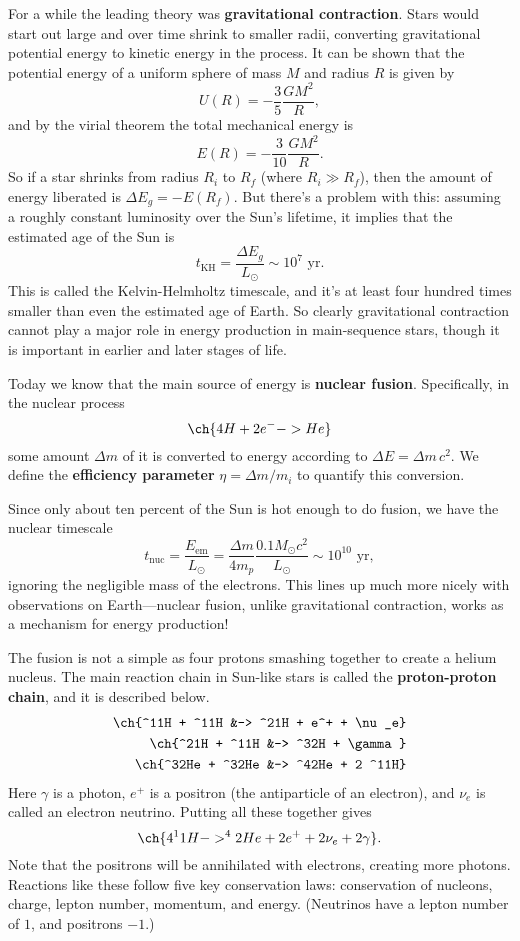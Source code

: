 \documentclass[../a062main.tex]{subfiles}
\begin{document}
For a while the leading theory was \textbf{gravitational contraction}.
Stars would start out large and over time shrink to smaller radii, converting gravitational potential energy to kinetic energy in the process.
It can be shown that the potential energy of a uniform sphere of mass $M$ and radius $R$ is given by
\[ U(R) = -\frac{3}{5} \frac{GM^2}{R}, \]
and by the virial theorem the total mechanical energy is
\[ E(R) = -\frac{3}{10} \frac{GM^2}{R}. \]
So if a star shrinks from radius $R_i$ to $R_f$ (where $R_i \gg R_f$), then the amount of energy liberated is $\Delta E_g = -E(R_f)$.
But there's a problem with this: assuming a roughly constant luminosity over the Sun's lifetime, it implies that the estimated age of the Sun is
\[ t_\textrm{KH} = \frac{\Delta E_g}{L_\odot} \sim 10^{7} \text{ yr}. \]
This is called the Kelvin-Helmholtz timescale, and it's at least four hundred times smaller than even the estimated age of Earth.
So clearly gravitational contraction cannot play a major role in energy production in main-sequence stars, though it is important in earlier and later stages of life.

Today we know that the main source of energy is \textbf{nuclear fusion}.
Specifically, in the nuclear process
\[ \ch{4 H + 2 e^- -> He} \]
some amount $\Delta m$ of it is converted to energy according to $\Delta E = \Delta m \,c^2$.
We define the \textbf{efficiency parameter} $\eta = \Delta m / m_i$ to quantify this conversion.

Since only about ten percent of the Sun is hot enough to do fusion, we have the nuclear timescale
\[ t_\textrm{nuc} = \frac{E_\textrm{em}}{L_\odot} = \frac{\Delta m}{4m_p} \frac{0.1 M_\odot c^2}{L_\odot} \sim 10^{10} \text{ yr}, \]
ignoring the negligible mass of the electrons.
This lines up much more nicely with observations on Earth---nuclear fusion, unlike gravitational contraction, works as a mechanism for energy production!

The fusion is not a simple as four protons smashing together to create a helium nucleus.
The main reaction chain in Sun-like stars is called the \textbf{proton-proton chain}, and it is described below.
\begin{align*}
    \ch{^11H + ^11H &-> ^21H + e^+ + \nu_e} \\
    \ch{^21H + ^11H &-> ^32H + \gamma} \\
    \ch{^32He + ^32He &-> ^42He + 2 ^11H}
\end{align*}
Here $\gamma$ is a photon, $e^+$ is a positron (the antiparticle of an electron), and $\nu_e$ is called an electron neutrino.
Putting all these together gives
\[ \ch{4 ^11H -> ^42He + 2 e^+ + 2 \nu_e + 2 \gamma}. \]
Note that the positrons will be annihilated with electrons, creating more photons.
Reactions like these follow five key conservation laws: conservation of nucleons, charge, lepton number, momentum, and energy.
(Neutrinos have a lepton number of $1$, and positrons $-1$.)
\end{document}
